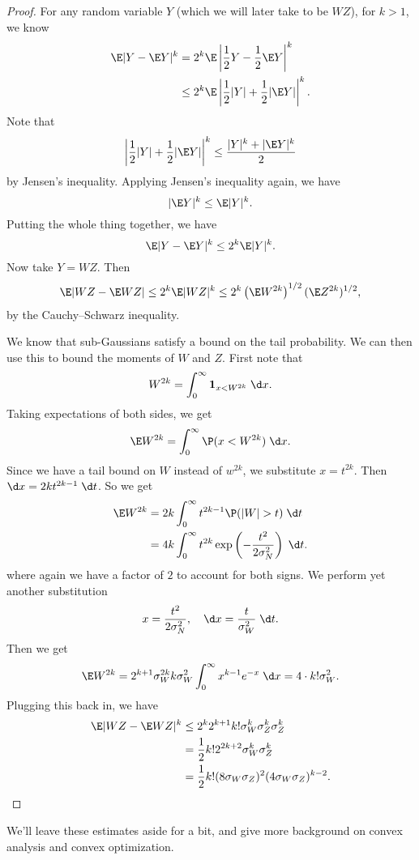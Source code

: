 \documentclass[a4paper]{article}
\begin{document}
\begin{proof}
  For any random variable $Y$ (which we will later take to be $WZ$), for $k > 1$, we know
  \begin{align*}
    \E |Y - \E Y|^k &= 2^k \E \left| \frac{1}{2}Y - \frac{1}{2}\E Y\right|^k\\
    &\leq 2^k \E \left| \frac{1}{2} |Y| + \frac{1}{2} |\E Y|\right|^k.
  \end{align*}
  Note that
  \[
    \left| \frac{1}{2} |Y| + \frac{1}{2} |\E Y|\right|^k \leq \frac{|Y|^k + |\E Y|^k}{2}
  \]
  by Jensen's inequality. Applying Jensen's inequality again, we have
  \[
    |\E Y|^k \leq \E |Y|^k.
  \]
  Putting the whole thing together, we have
  \[
    \E |Y - \E Y|^k \leq 2^k \E |Y|^k.
  \]
  Now take $Y = WZ$. Then
  \[
    \E |WZ - \E WZ| \leq 2^k \E |WZ|^k \leq 2^k \left(\E W^{2k}\right)^{1/2} (\E Z^{2k})^{1/2},
  \]
  by the Cauchy--Schwarz inequality.

  We know that sub-Gaussians satisfy a bound on the tail probability. We can then use this to bound the moments of $W$ and $Z$. First note that
  \[
    W^{2k} = \int_0^\infty \mathbf{1}_{x < W^{2k}} \;\d x.
  \]
  Taking expectations of both sides, we get
  \[
    \E W^{2k} = \int_0^\infty \P(x < W^{2k})\;\d x.
  \]
  Since we have a tail bound on $W$ instead of $w^{2k}$, we substitute $x = t^{2k}$. Then $\d x = 2k t^{2k - 1}\;\d t$. So we get
  \begin{align*}
    \E W^{2k} &= 2k \int_0^\infty t^{2k - 1} \P(|W| > t) \;\d t\\
    &= 4k \int_0^\infty t^{2k} \exp \left(-\frac{t^2}{2 \sigma_N^2}\right)\;\d t.
  \end{align*}
  where again we have a factor of $2$ to account for both signs. We perform yet another substitution
  \[
    x = \frac{t^2}{2 \sigma_N^2},\quad \d x = \frac{t}{\sigma_W^2}\;\d t.
  \]
  Then we get
  \[
    \E W^{2k} = 2^{k + 1} \sigma_W^{2k} k \sigma_W^2 \int_0^\infty x^{k - 1} e^{-x}\;\d x = 4 \cdot k! \sigma_W^2.
  \]
  Plugging this back in, we have
  \begin{align*}
    \E|WZ - \E WZ|^k &\leq 2^k 2^{k + 1} k! \sigma_W^k \sigma_Z^k \sigma_Z^k\\
    &= \frac{1}{2} k! 2^{2k + 2} \sigma_W^k \sigma_Z^k\\
    &= \frac{1}{2} k! (8 \sigma_W \sigma_Z)^2 (4 \sigma_W \sigma_Z)^{k - 2}.
  \end{align*}
\end{proof}

We'll leave these estimates aside for a bit, and give more background on convex analysis and convex optimization.
\end{document}
